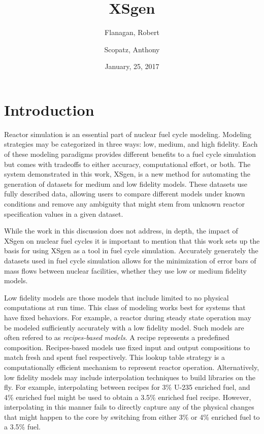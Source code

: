 \documentclass{article}
\begin{document}
\title{XSgen}
\date{January, 25, 2017}
\author{Flanagan, Robert \and Scopatz, Anthony}
\maketitle
\onehalfspacing

\section{Introduction}

Reactor simulation is an essential part of nuclear fuel cycle modeling. Modeling strategies
may be categorized in three ways: low, medium, and high fidelity. Each of these modeling
paradigms provides different benefits to a fuel cycle simulation but comes with tradeoffs to
either accuracy, computational effort, or both. The system demonstrated in this work, XSgen, 
is a new method for automating the generation of datasets for medium and low fidelity models. 
These datasets use fully described data, allowing users to compare different models under known
conditions and remove any ambiguity that might stem from unknown reactor specification values in a 
given dataset. 

While the work in this discussion does not address, in depth, the impact of XSgen on nuclear fuel cycles 
it is important to mention that this work sets up the basis for using XSgen as a tool in fuel cycle 
simulation. Accurately generately the datasets used in fuel cycle simulation allows for the minimization
of error bars of mass flows between nuclear facilities, whether they use low or medium fidelity models. 

Low fidelity models are those models that include limited to no physical computations at run time.
This class of modeling works best for systems that have fixed behaviors. For example, a reactor
during steady state operation may be modeled sufficiently accurately with a low fidelity model.
Such models are often refered to as \emph{recipes-based models}. A recipe represents a predefined
composition. Recipes-based models use fixed input and output compositions to
match fresh and spent
fuel respectively. This lookup table strategy is a computationally efficient mechanism to
represent reactor operation. Alternatively, low fidelity models may include interpolation
techniques to build libraries on the fly. For example, interpolating between recipes for
3\% U-235 enriched fuel, and 4\% enriched fuel might be used to obtain a 3.5\% enriched
fuel recipe.
However, interpolating in this manner fails to directly capture any of the physical changes
that might happen to the core by switching from either 3\% or 4\% enriched fuel to a 3.5\% fuel.
\end{document}
